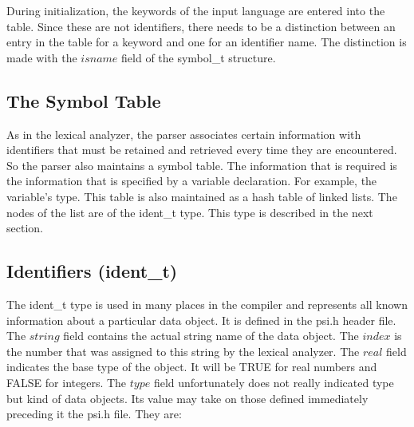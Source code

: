 During initialization, the keywords of the input language are entered into
the table.  Since these are not identifiers, there needs to be a distinction
between an entry in the table for a keyword and one for an identifier name.
The distinction is made with the $isname$ field of the symbol\_t structure.

\subsection{The Symbol Table}
As in the lexical analyzer, the parser associates certain information with
identifiers that must be retained and retrieved every time they are 
encountered.  So the parser also maintains a symbol table.  The information
that is required is the information that is specified by a variable 
declaration.  For example, the variable's type.  This table is also maintained
as a hash table of linked lists.  The nodes of the list are of the ident\_t
type.  This type is described in the next section.

\subsection{Identifiers (ident\_t)}
The ident\_t type is used in many places in the compiler and represents
all known information about a particular data object.  It is defined in the
psi.h header file. The $string$ field
contains the actual string name of the data object.  The $index$ is the
number that was assigned to this string by the lexical analyzer.  The $real$
field indicates the base type of the object.  It will be TRUE for real numbers
and FALSE for integers.  The $type$ field unfortunately does not really 
indicated type but kind of data objects.  Its value may take on those
defined immediately preceding it the psi.h file.  They are:

